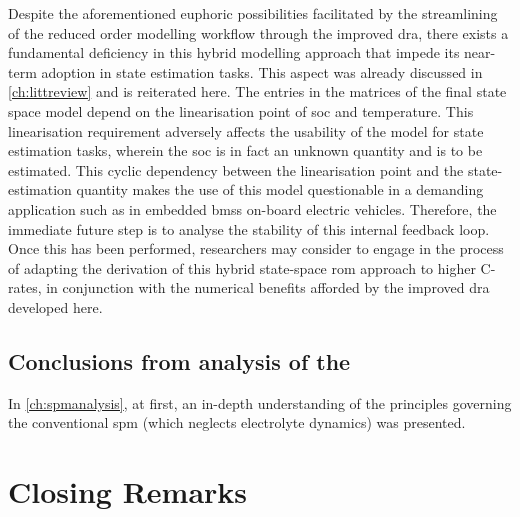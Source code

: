 Despite   the  aforementioned   euphoric   possibilities   facilitated  by   the
streamlining  of  the reduced  order  modelling  workflow through  the  improved
\gls{dra},  there  exists a  fundamental  deficiency  in this  hybrid  modelling
approach  that impede  its near-term  adoption in  state estimation  tasks. This
aspect was already discussed in \cref{ch:littreview} and is reiterated here. The
entries  in  the  matrices  of  the  final  state  space  model  depend  on  the
linearisation point of \gls{soc} and temperature. This linearisation requirement
adversely affects the usability of the model for state estimation tasks, wherein
the \gls{soc} is in fact an unknown quantity and is to be estimated. This cyclic
dependency  between the  linearisation point  and the  state-estimation quantity
makes the use of  this model questionable in a demanding  application such as in
embedded \glspl{bms} on-board electric vehicles. Therefore, the immediate future
step is to analyse  the stability of this internal feedback  loop. Once this has
been performed,  researchers may consider to  engage in the process  of adapting
the derivation of this hybrid  state-space \gls{rom} approach to higher C-rates,
in conjunction  with the numerical  benefits afforded by the  improved \gls{dra}
developed here.


\subsection{Conclusions from analysis of the }

In \cref{ch:spmanalysis}, at first, an  in-depth understanding of the principles
governing the  conventional \gls{spm} (which neglects  electrolyte dynamics) was
presented.

\section{Closing Remarks}








